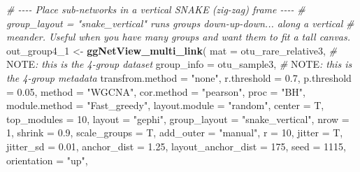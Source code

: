 \documentclass[
]{book}
\newenvironment{Shaded}{\begin{snugshade}}{\end{snugshade}}
\newcommand{\AlertTok}[1]{\textcolor[rgb]{0.94,0.16,0.16}{#1}}
\newcommand{\AttributeTok}[1]{\textcolor[rgb]{0.13,0.29,0.53}{#1}}
\newcommand{\CommentTok}[1]{\textcolor[rgb]{0.56,0.35,0.01}{\textit{#1}}}
\newcommand{\DecValTok}[1]{\textcolor[rgb]{0.00,0.00,0.81}{#1}}
\newcommand{\FloatTok}[1]{\textcolor[rgb]{0.00,0.00,0.81}{#1}}
\newcommand{\FunctionTok}[1]{\textcolor[rgb]{0.13,0.29,0.53}{\textbf{#1}}}
\newcommand{\NormalTok}[1]{#1}
\newcommand{\OtherTok}[1]{\textcolor[rgb]{0.56,0.35,0.01}{#1}}
\newcommand{\StringTok}[1]{\textcolor[rgb]{0.31,0.60,0.02}{#1}}
\begin{document}
\begin{Shaded}
\begin{Highlighting}[]
\CommentTok{\# {-}{-}{-}{-} Place sub{-}networks in a vertical SNAKE (zig{-}zag) frame {-}{-}{-}{-}}
\CommentTok{\# \textasciigrave{}group\_layout = "snake\_vertical"\textasciigrave{} runs groups down{-}up{-}down... along a vertical}
\CommentTok{\# meander. Useful when you have many groups and want them to fit a tall canvas.}
\NormalTok{out\_group4\_1 }\OtherTok{\textless{}{-}} \FunctionTok{ggNetView\_multi\_link}\NormalTok{(}
  \AttributeTok{mat                          =}\NormalTok{ otu\_rare\_relative3,   }\CommentTok{\# }\AlertTok{NOTE}\CommentTok{: this is the 4{-}group dataset}
  \AttributeTok{group\_info                   =}\NormalTok{ otu\_sample3,          }\CommentTok{\# }\AlertTok{NOTE}\CommentTok{: this is the 4{-}group metadata}
  \AttributeTok{transfrom.method             =} \StringTok{"none"}\NormalTok{,}
  \AttributeTok{r.threshold                  =} \FloatTok{0.7}\NormalTok{,}
  \AttributeTok{p.threshold                  =} \FloatTok{0.05}\NormalTok{,}
  \AttributeTok{method                       =} \StringTok{"WGCNA"}\NormalTok{,}
  \AttributeTok{cor.method                   =} \StringTok{"pearson"}\NormalTok{,}
  \AttributeTok{proc                         =} \StringTok{"BH"}\NormalTok{,}
  \AttributeTok{module.method                =} \StringTok{"Fast\_greedy"}\NormalTok{,}
  \AttributeTok{layout.module                =} \StringTok{"random"}\NormalTok{,}
  \AttributeTok{center                       =}\NormalTok{ T,}
  \AttributeTok{top\_modules                  =} \DecValTok{10}\NormalTok{,}
  \AttributeTok{layout                       =} \StringTok{"gephi"}\NormalTok{,}
  \AttributeTok{group\_layout                 =} \StringTok{"snake\_vertical"}\NormalTok{,}
  \AttributeTok{nrow                         =} \DecValTok{1}\NormalTok{,}
  \AttributeTok{shrink                       =} \FloatTok{0.9}\NormalTok{,}
  \AttributeTok{scale\_groups                 =}\NormalTok{ T,}
  \AttributeTok{add\_outer                    =} \StringTok{"manual"}\NormalTok{,}
  \AttributeTok{r                            =} \DecValTok{10}\NormalTok{,}
  \AttributeTok{jitter                       =}\NormalTok{ T,}
  \AttributeTok{jitter\_sd                    =} \FloatTok{0.01}\NormalTok{,}
  \AttributeTok{anchor\_dist                  =} \FloatTok{1.25}\NormalTok{,}
  \AttributeTok{layout\_anchor\_dist           =} \DecValTok{175}\NormalTok{,}
  \AttributeTok{seed                         =} \DecValTok{1115}\NormalTok{,}
  \AttributeTok{orientation                  =} \StringTok{"up"}\NormalTok{,}

\end{Highlighting}
\end{Shaded}
\end{document}
